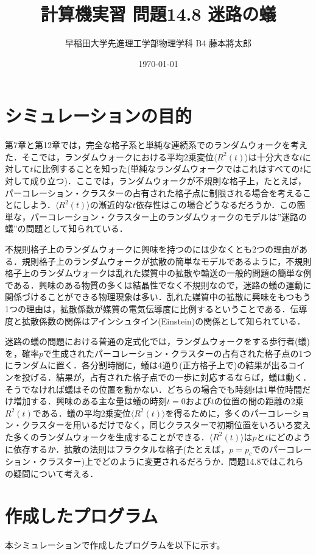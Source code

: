 \documentclass{jsarticle}
\title{計算機実習 問題14.8 迷路の蟻}
\author{早稲田大学先進理工学部物理学科 B4 藤本將太郎}
\date{\today}
\begin{document}
\maketitle
    
\section{シミュレーションの目的}
    第7章と第12章では，完全な格子系と単純な連続系でのランダムウォークを考えた．そこでは，ランダムウォークにおける平均2乗変位$\langle R^{2}(t) \rangle$は十分大きな$t$に対して$t$に比例することを知った(単純なランダムウォークではこれはすべての$t$に対して成り立つ)．ここでは，ランダムウォークが不規則な格子上，たとえば，パーコレーション・クラスターの占有された格子点に制限される場合を考えることにしよう．$\langle R^{2}(t) \rangle$の漸近的な$t$依存性はこの場合どうなるだろうか．この簡単な，パーコレーション・クラスター上のランダムウォークのモデルは”迷路の蟻”の問題として知られている．
    
    不規則格子上のランダムウォークに興味を持つのには少なくとも2つの理由がある．規則格子上のランダムウォークが拡散の簡単なモデルであるように，不規則格子上のランダムウォークは乱れた媒質中の拡散や輸送の一般的問題の簡単な例である．興味のある物質の多くは結晶性でなく不規則なので，迷路の蟻の運動に関係づけることができる物理現象は多い．乱れた媒質中の拡散に興味をもつもう1つの理由は，拡散係数が媒質の電気伝導度に比例するということである．伝導度と拡散係数の関係はアインシュタイン(Einstein)の関係として知られている．
    
    迷路の蟻の問題における普通の定式化では，ランダムウォークをする歩行者(蟻)を，確率$p$で生成されたパーコレーション・クラスターの占有された格子点の1つにランダムに置く．各分割時間に，蟻は4通り(正方格子上で)の結果が出るコインを投げる．結果が，占有された格子点での一歩に対応するならば，蟻は動く．そうでなければ蟻はその位置を動かない．どちらの場合でも時刻$t$は1単位時間だけ増加する．興味のある主な量は蟻の時刻$t=0$および$t$の位置の間の距離の2乗$R^{2}(t)$である．蟻の平均2乗変位$\langle R^{2}(t) \rangle$を得るために，多くのパーコレーション・クラスターを用いるだけでなく，同じクラスターで初期位置をいろいろ変えた多くのランダムウォークを生成することができる．$\langle R^{2}(t) \rangle$は$p$と$t$にどのように依存するか．拡散の法則はフラクタルな格子(たとえば，$p=p_{c}$でのパーコレーション・クラスター)上でどのように変更されるだろうか．問題14.8ではこれらの疑問について考える．

\section{作成したプログラム}
    本シミュレーションで作成したプログラムを以下に示す。
\end{document}
